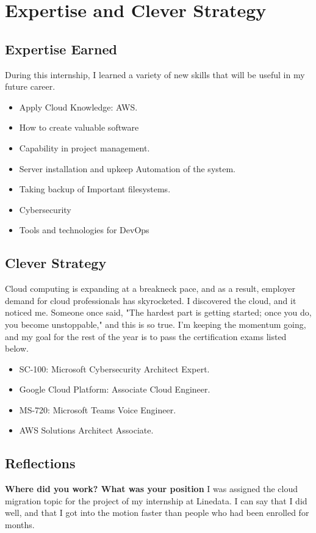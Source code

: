 \chapter{Expertise and Clever Strategy}


\section{Expertise Earned}
  During this internship, I learned a variety of new skills that will be useful in my future career.
\begin{itemize}
  \item Apply Cloud Knowledge: AWS.
  \item How to create valuable software
  \item Capability in project management.
  \item Server installation and upkeep Automation of the system.
  \item Taking backup of Important filesystems.
  \item Cybersecurity
  \item Tools and technologies for DevOps
  

\end{itemize}

\section{Clever Strategy}

Cloud computing is expanding at a breakneck pace, and as a result, employer demand for cloud professionals has skyrocketed. I discovered the cloud, and it noticed me.
Someone once said, "The hardest part is getting started; once you do, you become unstoppable," and this is so true. I'm keeping the momentum going, and my goal for the rest of the year is to pass the certification exams listed below.

\begin{itemize}
  \item SC-100: Microsoft Cybersecurity Architect Expert.
  \item Google Cloud Platform: Associate Cloud Engineer.
  \item MS-720: Microsoft Teams Voice Engineer.
  \item AWS Solutions Architect Associate.
\end{itemize}

\section{Reflections}
\textbf{Where did you work? What was your position}\newline
I was assigned the cloud migration topic for the project of my internship at Linedata. I can say that I did well, and that I got into the motion faster than people who had been enrolled for months.
\newline

